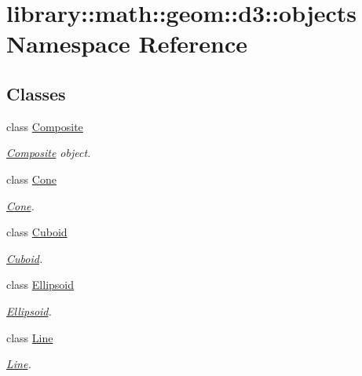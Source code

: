 \hypertarget{namespacelibrary_1_1math_1_1geom_1_1d3_1_1objects}{}\section{library\+:\+:math\+:\+:geom\+:\+:d3\+:\+:objects Namespace Reference}
\label{namespacelibrary_1_1math_1_1geom_1_1d3_1_1objects}
\subsection*{Classes}
\begin{DoxyCompactItemize}
\item 
class \hyperlink{classlibrary_1_1math_1_1geom_1_1d3_1_1objects_1_1_composite}{Composite}
\begin{DoxyCompactList}\small\item\em \hyperlink{classlibrary_1_1math_1_1geom_1_1d3_1_1objects_1_1_composite}{Composite} object. \end{DoxyCompactList}\item 
class \hyperlink{classlibrary_1_1math_1_1geom_1_1d3_1_1objects_1_1_cone}{Cone}
\begin{DoxyCompactList}\small\item\em \hyperlink{classlibrary_1_1math_1_1geom_1_1d3_1_1objects_1_1_cone}{Cone}. \end{DoxyCompactList}\item 
class \hyperlink{classlibrary_1_1math_1_1geom_1_1d3_1_1objects_1_1_cuboid}{Cuboid}
\begin{DoxyCompactList}\small\item\em \hyperlink{classlibrary_1_1math_1_1geom_1_1d3_1_1objects_1_1_cuboid}{Cuboid}. \end{DoxyCompactList}\item 
class \hyperlink{classlibrary_1_1math_1_1geom_1_1d3_1_1objects_1_1_ellipsoid}{Ellipsoid}
\begin{DoxyCompactList}\small\item\em \hyperlink{classlibrary_1_1math_1_1geom_1_1d3_1_1objects_1_1_ellipsoid}{Ellipsoid}. \end{DoxyCompactList}\item 
class \hyperlink{classlibrary_1_1math_1_1geom_1_1d3_1_1objects_1_1_line}{Line}
\begin{DoxyCompactList}\small\item\em \hyperlink{classlibrary_1_1math_1_1geom_1_1d3_1_1objects_1_1_line}{Line}. \end{DoxyCompactList}\item 

\end{DoxyCompactItemize}
